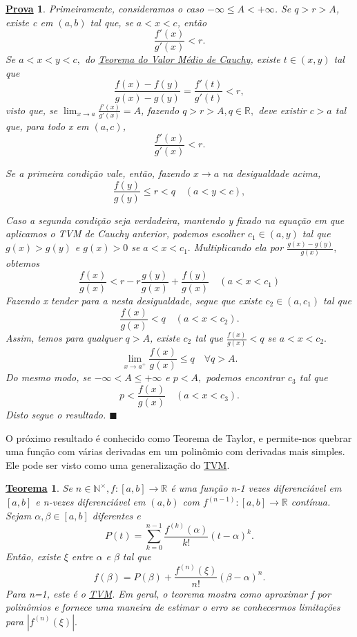 \documentclass{article}
\newtheorem*{theorem*}{\underline{Teorema}}
\newtheorem*{proof*}{\underline{Prova}}
\renewcommand\qedsymbol{$\blacksquare$}
\begin{document}
 \begin{proof*}
   Primeiramente, consideramos o caso \(-\infty\leq A < +\infty\). Se \(q > r > A\),
   existe c em \((a, b)\) tal que, se \(a < x < c\), então 
     \[
       \frac{f'(x)}{g'(x)} < r.
     \]
    Se \(a < x < y < c,\) do \hyperlink{cauchy_mvt}{Teorema do Valor Médio de Cauchy}, existe 
    \(t\in (x, y)\) tal que 
      \[
        \frac{f(x) - f(y)}{g(x) - g(y)} = \frac{f'(t)}{g'(t)} < r,
      \] 
    visto que, se \(\lim_{x\to a}\frac{f'(x)}{g'(x)} = A\), fazendo \(q > r > A, q\in \mathbb{R},\)
    deve existir \(c > a\) tal que, para todo x em \((a, c)\), 
    \[
      \frac{f'(x)}{g'(x)} < r.
    \]

    Se a primeira condi\c cão vale, então, fazendo \(x\rightarrow a\) na desigualdade acima, 
      \[
        \frac{f(y)}{g(y)}\leq r < q \quad (a < y < c),
      \]

    Caso a segunda condi\c cão seja verdadeira, mantendo y fixado na equa\c cão em que aplicamos o TVM de Cauchy anterior,
    podemos escolher \(c_{1}\in (a, y)\) tal que \(g(x) > g(y) \) e \(g(x) > 0\) se 
    \(a < x < c_{1}.\) Multiplicando ela por \(\frac{g(x)-g(y)}{g(x)},\) obtemos 
      \[
        \frac{f(x)}{g(x)} < r - r\frac{g(y)}{g(x)} + \frac{f(y)}{g(x)}\quad (a < x < c_{1})
      \]
    Fazendo x tender para a nesta desigualdade, segue que existe \(c_{2}\in (a, c_{1})\)
    tal que 
      \[
        \frac{f(x)}{g(x)} < q\quad (a < x < c_{2}).
      \]
    Assim, temos para qualquer \(q > A\), existe \(c_{2}\) tal que \(\frac{f(x)}{g(x)} < q\) se \(a < x < c_{2}.\)
      \[
        \lim_{x\to a^{+}} \frac{f(x)}{g(x)}\leq q \quad\forall q > A.
      \]
      Do mesmo modo, se \(-\infty < A\leq +\infty\) e \(p < A,\) podemos encontrar
    \(c_{3}\) tal que 
      \[
        p < \frac{f(x)}{g(x)}\quad (a < x < c_{3}).
      \]
      Disto segue o resultado. \qedsymbol
 \end{proof*}
  O próximo resultado é conhecido como Teorema de Taylor, e permite-nos quebrar
  uma fun\c cão com várias derivadas em um polinômio com derivadas mais simples.
  Ele pode ser visto como uma generaliza\c cão do \hyperlink{mean_value}{TVM}.
  \hypertarget{taylor}{
 \begin{theorem*}
   Se \(n\in \mathbb{N}^{\times}, f:[a, b]\rightarrow \mathbb{R}\) é uma fun\c cão
   n-1 vezes diferenciável em \([a, b]\) e n-vezes diferenciável em \((a, b)\) com
   \(f^{(n-1)}:[a, b]\rightarrow \mathbb{R}\) contínua. Sejam \(\alpha , \beta \in[a, b]\) diferentes
   e 
     \[
       P(t) = \sum\limits_{k=0}^{n-1}\frac{f^{(k)}(\alpha )}{k!}(t-\alpha )^{k}.
     \]
    Então, existe \(\xi\) entre \(\alpha  \) e \(\beta \) tal que 
      \[
        f(\beta ) = P(\beta ) + \frac{f^{(n)}(\xi)}{n!}(\beta -\alpha )^{n}.
      \]
    Para n=1, este é o \hyperlink{mean_value}{TVM}. Em geral, o teorema mostra
    como aproximar f por polinômios e fornece uma maneira de estimar o erro
    se conhecermos limita\c cões para \(|f^{(n)}(\xi)|.\)
 \end{theorem*}}
\end{document}
